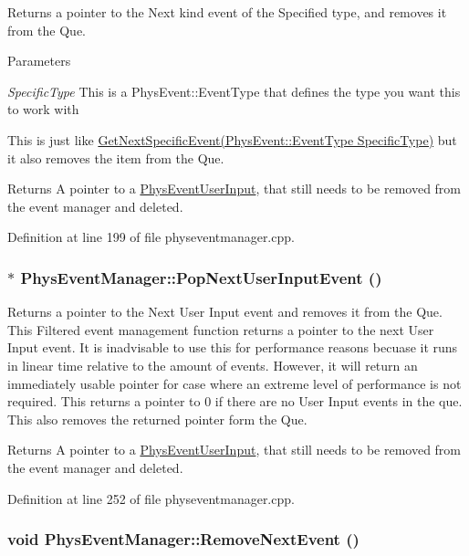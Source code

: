 Returns a pointer to the Next kind event of the Specified type, and removes it from the Que. 
\begin{DoxyParams}{Parameters}
\item[{\em SpecificType}]This is a PhysEvent::EventType that defines the type you want this to work with\end{DoxyParams}
This is just like \hyperlink{classPhysEventManager_a56e45572c2fb84131f7d55c060c7ac21}{GetNextSpecificEvent(PhysEvent::EventType SpecificType)} but it also removes the item from the Que. \begin{DoxyReturn}{Returns}
A pointer to a \hyperlink{classPhysEventUserInput}{PhysEventUserInput}, that still needs to be removed from the event manager and deleted. 
\end{DoxyReturn}


Definition at line 199 of file physeventmanager.cpp.\hypertarget{classPhysEventManager_ad6612a6e1c728941e2c467e7f136ca51}{
\subsubsection[{PopNextUserInputEvent}]{ $\ast$ PhysEventManager::PopNextUserInputEvent ()}}
\label{d5/dd7/classPhysEventManager_ad6612a6e1c728941e2c467e7f136ca51}


Returns a pointer to the Next User Input event and removes it from the Que. This Filtered event management function returns a pointer to the next User Input event. It is inadvisable to use this for performance reasons becuase it runs in linear time relative to the amount of events. However, it will return an immediately usable pointer for case where an extreme level of performance is not required. This returns a pointer to 0 if there are no User Input events in the que. This also removes the returned pointer form the Que. \begin{DoxyReturn}{Returns}
A pointer to a \hyperlink{classPhysEventUserInput}{PhysEventUserInput}, that still needs to be removed from the event manager and deleted. 
\end{DoxyReturn}


Definition at line 252 of file physeventmanager.cpp.\hypertarget{classPhysEventManager_ad040054bd9018ff0fd27ad78ec1e87fa}{
\subsubsection[{RemoveNextEvent}]{\setlength{\rightskip}{0pt plus 5cm}void PhysEventManager::RemoveNextEvent ()}}
\label{d5/dd7/classPhysEventManager_ad040054bd9018ff0fd27ad78ec1e87fa}



